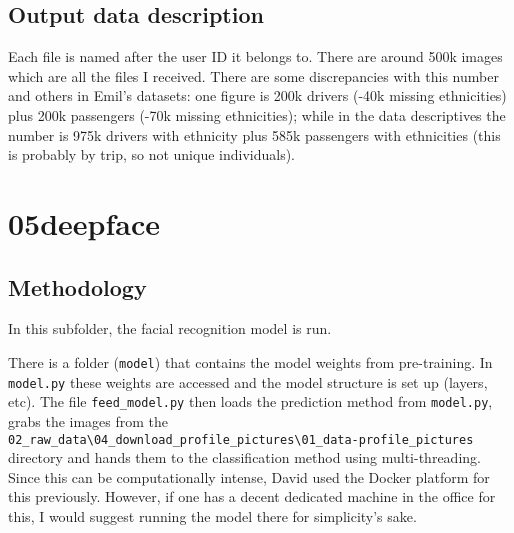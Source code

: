 \documentclass[11pt,a4paper]{article}
\begin{document}
\subsection{Output data description}
Each file is named after the user ID it belongs to.
There are around 500k images which are all the files I received.
There are some discrepancies with this number and others in Emil's datasets: 
one figure is 200k drivers (-40k missing ethnicities) plus 200k passengers (-70k missing ethnicities); 
while in the data descriptives the number is 975k drivers with ethnicity plus 585k passengers with ethnicities (this is probably by trip, so not unique individuals).












\clearpage %
\section{05\textunderscore deepface}

\subsection{Methodology}

In this subfolder, the facial recognition model is run.

There is a folder (\verb|model|) that contains the model weights from pre-training. 
In \verb|model.py| these weights are accessed and the model structure is set up (layers, etc).
The file \verb|feed_model.py| then loads the prediction method from \verb|model.py|, grabs the images from the \\\verb|02_raw_data\04_download_profile_pictures\01_data-profile_pictures| directory and hands them to the classification method using multi-threading.
Since this can be computationally intense, David used the Docker platform for this previously. 
However, if one has a decent dedicated machine in the office for this, I would suggest running the model there for simplicity's sake.
\end{document}
